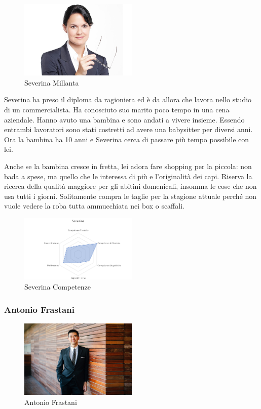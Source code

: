 \documentclass[12pt,italian,]{report}
\begin{document}
\begin{figure}[h]
\centering
\includegraphics[width=0.5\textwidth,height=\textheight]{img/severina.jpg}
\caption{Severina Millanta}
\end{figure}

Severina ha preso il diploma da ragioniera ed è da allora che lavora
nello studio di un commercialista. Ha conosciuto suo marito poco tempo
in una cena aziendale. Hanno avuto una bambina e sono andati a vivere
insieme. Essendo entrambi lavoratori sono stati costretti ad avere una
babysitter per diversi anni. Ora la bambina ha 10 anni e Severina cerca
di passare più tempo possibile con lei.

Anche se la bambina cresce in fretta, lei adora fare shopping per la
piccola: non bada a spese, ma quello che le interessa di più e
l'originalità dei capi. Riserva la ricerca della qualità maggiore per
gli abitini domenicali, insomma le cose che non usa tutti i giorni.
Solitamente compra le taglie per la stagione attuale perché non vuole
vedere la roba tutta ammucchiata nei box o scaffali.

\begin{figure}[h]
\centering
\includegraphics[width=0.5\textwidth,height=\textheight]{img/severina_competenze.png}
\caption{Severina Competenze}
\end{figure}

\hypertarget{antonio-frastani-1}{%
\subsubsection{Antonio Frastani}\label{antonio-frastani-1}}

\begin{figure}[h]
\centering
\includegraphics[width=0.5\textwidth,height=\textheight]{img/antonio.jpeg}
\caption{Antonio Frastani}
\end{figure}
\end{document}
